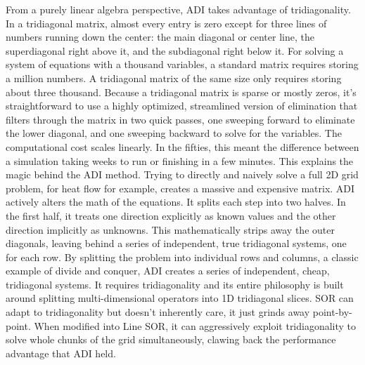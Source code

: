 From a purely linear algebra perspective, ADI takes advantage of tridiagonality. In a tridiagonal matrix, almost every entry is zero except for three lines of numbers running down the center: the main diagonal or center line, the superdiagonal right above it, and the subdiagonal right below it. For solving a system of equations with a thousand variables, a standard matrix requires storing a million numbers. A tridiagonal matrix of the same size only requires storing about three thousand. Because a tridiagonal matrix is sparse or mostly zeros, it’s straightforward to use a highly optimized, streamlined version of elimination that filters through the matrix in two quick passes, one sweeping forward to eliminate the lower diagonal, and one sweeping backward to solve for the variables. The computational cost scales linearly. In the fifties, this meant the difference between a simulation taking weeks to run or finishing in a few minutes. This explains the magic behind the ADI method. Trying to directly and naively solve a full 2D grid problem, for heat flow for example, creates a massive and expensive matrix. ADI actively alters the math of the equations. It splits each step into two halves. In the first half, it treats one direction explicitly as known values and the other direction implicitly as unknowns. This mathematically strips away the outer diagonals, leaving behind a series of independent, true tridiagonal systems, one for each row. By splitting the problem into individual rows and columns, a classic example of divide and conquer, ADI creates a series of independent, cheap, tridiagonal systems. It requires tridiagonality and its entire philosophy is built around splitting multi-dimensional operators into 1D tridiagonal slices. SOR can adapt to tridiagonality but doesn't inherently care, it just grinds away point-by-point. When modified into Line SOR, it can aggressively exploit tridiagonality to solve whole chunks of the grid simultaneously, clawing back the performance advantage that ADI held. 

